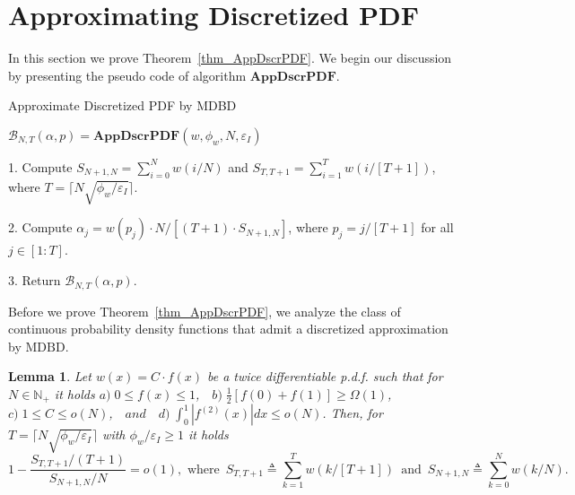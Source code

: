 \documentclass[11pt]{article}
\newcommand{\phiw}{\phi_{w}}
\newcommand{\epsI}{\eps_{I}}
\newcommand{\MDBD}{\mathrm{MDBD}}
\newcommand{\BNTap}{\mathcal{B}_{N,T}(\alpha,p)}
\newcommand{\AppDscrPDF}{\mathrm{\mathbf{AppDscrPDF}}}
\newcommand{\N}{\mathbb{N}}
\newcommand{\eps}{\epsilon}
\renewcommand{\leq}{\leqslant}
\renewcommand{\geq}{\geqslant}
\renewcommand{\eps}{\varepsilon}
\newtheorem{lem}[thm]{Lemma}
\numberwithin{thm}{section}
\begin{document}
\section{Approximating Discretized PDF}\label{sec:approxDiscrPDFs}

In this section we prove Theorem~\ref{thm_AppDscrPDF}. We begin our discussion by presenting the pseudo code of algorithm $\AppDscrPDF$.

\begin{algorithm}[H]
\caption{Approximate Discretized PDF by MDBD}


$\BNTap=\AppDscrPDF(w,\phiw,N,\eps_{I})$

1. Compute $S_{N+1,N}=\sum_{i=0}^{N}w(i/N)$ and $S_{T,T+1}=\sum_{i=1}^{T}w(i/[T+1])$, where $T=\lceil N\sqrt{\phiw/\eps_{I}} \rceil$.

2. Compute $\alpha_{j} = w(p_{j})\cdot N/[(T+1)\cdot S_{N+1,N}]$,
where $p_{j}=j/[T+1]$ for all $j\in[1:T]$.

3. Return $\BNTap$.
\end{algorithm}


Before we prove Theorem~\ref{thm_AppDscrPDF}, we analyze the class of continuous probability density functions that admit a discretized approximation by $\MDBD$.

\begin{lem}
\label{lem_RatioLambda} Let $w(x)=C\cdot f(x)$ be a twice differentiable p.d.f. such that for $N\in\N_+$ it holds $a)\;0\leq f(x)\leq1$,\,\,\,\,\,\,$b)\;\frac{1}{2}[f(0)+f(1)] \geq \Omega(1)$,\,\,\,\,\,\,$c)\;1\leq C\leq o(N)$,\,\,\,\,\,\,$ and $\,\,\,\,\,\,$d)\;\int_{0}^{1}\left|f^{(2)}(x)\right|dx\leq o(N)$.
Then, for $T=\lceil N\sqrt{\phiw/\epsI} \rceil$ with $\phiw/\epsI\geq 1$ it holds
\[
1-\frac{S_{T,T+1}/(T+1)}{S_{N+1,N}/N}=o(1),\,\,\text{where}\,\,\, S_{T,T+1}\triangleq\sum_{k=1}^{T}w(k/[T+1])\,\,\,\text{and}\,\,\, S_{N+1,N}\triangleq\sum_{k=0}^{N}w(k/N).
\]
\end{lem}
\end{document}
